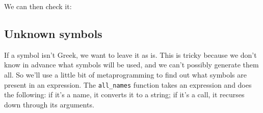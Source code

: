 We can then check it:

\begin{Shaded}
\begin{Highlighting}[]
\StringTok{ }
\NormalTok{\}}

\end{Highlighting}
\end{Shaded}

\subsection{Unknown symbols}

If a symbol isn't Greek, we want to leave it as is. This is tricky
because we don't know in advance what symbols will be used, and we can't
possibly generate them all. So we'll use a little bit of metaprogramming
to find out what symbols are present in an expression. The
\texttt{all\_names} function takes an expression and does the following:
if it's a name, it converts it to a string; if it's a call, it recurses
down through its arguments.

\begin{Shaded}
\begin{Highlighting}[]
\StringTok{ }
    \NormalTok{()}
  \StringTok{ }
    \StringTok{ }\NormalTok{(x[-}\NormalTok{], all_names)}
    \NormalTok{(}
    \NormalTok{(}\NormalTok{, }
       \NormalTok{)}
  \NormalTok{\}}
\NormalTok{\}}

\NormalTok{(}\StringTok{ }\StringTok{ }\NormalTok{)))}
\end{Highlighting}
\end{Shaded}

